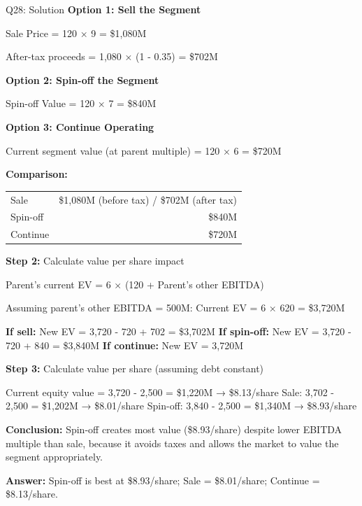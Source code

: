 \documentclass{beamer}
\renewcommand{\scriptsize}{\fontsize{6pt}{7pt}\selectfont}
\begin{document}
	\begin{frame}{Q28: Solution}
		\scriptsize
		\textbf{Option 1: Sell the Segment}
		
		Sale Price = 120 × 9 = \$1,080M
		
		After-tax proceeds = 1,080 × (1 - 0.35) = \$702M
		
		\vspace{2pt}
		\textbf{Option 2: Spin-off the Segment}
		
		Spin-off Value = 120 × 7 = \$840M
		
		\vspace{2pt}
		\textbf{Option 3: Continue Operating}
		
		Current segment value (at parent multiple) = 120 × 6 = \$720M
		
		\vspace{2pt}
		\textbf{Comparison:}
		
		\begin{tabular}{lr}
			Sale & \$1,080M (before tax) / \$702M (after tax) \\
			Spin-off & \$840M \\
			Continue & \$720M \\
		\end{tabular}
		
		\vspace{2pt}
		\textbf{Step 2:} Calculate value per share impact
		
		Parent's current EV = 6 × (120 + Parent's other EBITDA)
		
		Assuming parent's other EBITDA = 500M:
		Current EV = 6 × 620 = \$3,720M
		
		\vspace{2pt}
		\textbf{If sell:} New EV = 3,720 - 720 + 702 = \$3,702M
		\textbf{If spin-off:} New EV = 3,720 - 720 + 840 = \$3,840M
		\textbf{If continue:} New EV = 3,720M
		
		\vspace{2pt}
		\textbf{Step 3:} Calculate value per share (assuming debt constant)
		
		Current equity value = 3,720 - 2,500 = \$1,220M → \$8.13/share
		Sale: 3,702 - 2,500 = \$1,202M → \$8.01/share
		Spin-off: 3,840 - 2,500 = \$1,340M → \$8.93/share
		
		\vspace{2pt}
		\textbf{Conclusion:} Spin-off creates most value (\$8.93/share) despite lower EBITDA multiple than sale, because it avoids taxes and allows the market to value the segment appropriately.
		
		\textbf{Answer:} Spin-off is best at \$8.93/share; Sale = \$8.01/share; Continue = \$8.13/share.
	\end{frame}
	
\end{document}

